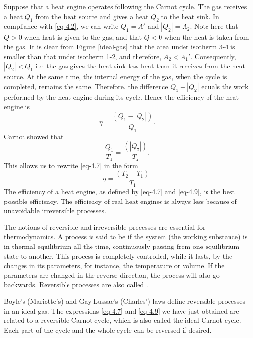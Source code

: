 Suppose that a heat engine operates following the Carnot cycle. The gas receives a heat $Q_{1}$ from the beat source and gives a heat $Q_{2}$ to the heat sink. In compliance with \eqref{eq-4.2}, we can write $Q_{1} = A'$ and $|Q_{2}| = A_{2}$. Note here that $Q > 0$ when heat is given to the gas, and that $Q < 0$ when the heat is taken from the gas. It is clear from \hyperref[ideal-gas]{Figure \ref{ideal-gas}} that the area under isotherm 3-4 is smaller than that under isotherm 1-2, and therefore, $A_{2} < A_{1}'$. Consequently, $|Q_{2}| < Q_{1}$ i.e. the gas gives the heat sink less heat than it receives from the heat source. At the same time, the internal energy of the gas, when the cycle is completed, remains the same. Therefore, the difference $Q_{1} - |Q_{2}|$ equals the work performed by the heat engine during its cycle. Hence the
efficiency of the heat engine is 
\begin{equation}%
\eta = \frac{(Q_{1} - |Q_{2}|)}{Q_{1}}.
\label{eq-4.7}
\end{equation}
Carnot showed that
\begin{equation}%
\frac{Q_{1}}{T_{1}} = \frac{(|Q_{2}|)}{T_{2}}.
\label{eq-4.8}
\end{equation}
This allows us to rewrite \eqref{eq-4.7} in the form 
\begin{equation}%
\eta = \frac{(T_{2} - T_{1})}{T_{1}}.
\label{eq-4.9}
\end{equation}
The efficiency of a heat engine, as defined by \eqref{eq-4.7} and \eqref{eq-4.9}, is the best possible efficiency. The efficiency of real heat engines is always less because of unavoidable irreversible processes.

 The notions of reversible and irreversible processes are essential for thermodynamics. A process is said to be  if the system (the working substance) is in thermal equilibrium all the time, continuously passing from one equilibrium state to another. This process is completely controlled, while it lasts, by the changes in its parameters, for instance, the temperature or volume. If the parameters are changed in the reverse direction, the process will also go backwards. Reversible processes are also called .

Boyle's (Mariotte's) and Gay-Lussac's (Charles') laws define reversible processes in an ideal gas. The expressions \eqref{eq-4.7} and \eqref{eq-4.9} we have just obtained are related to a reversible Carnot cycle, which is also called the ideal Carnot cycle. Each part of the cycle and the whole cycle can be reversed if desired.

